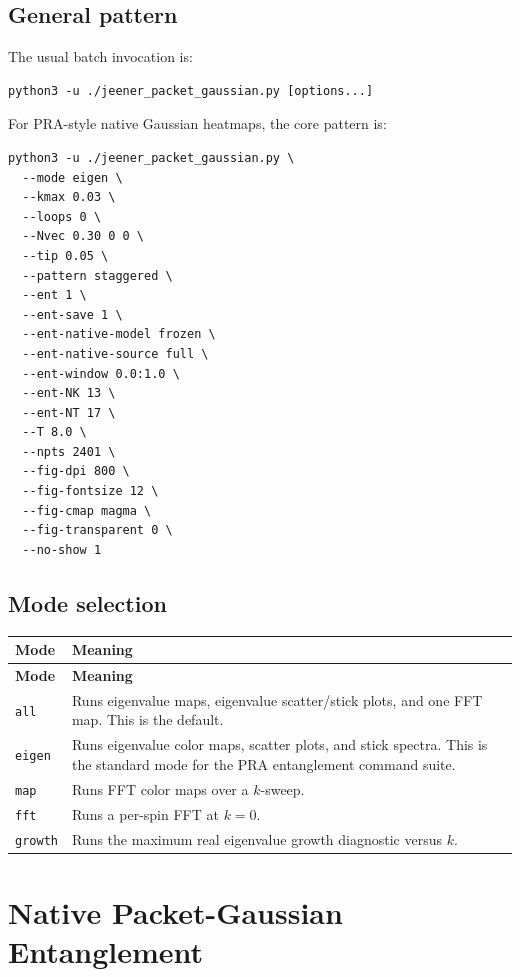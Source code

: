 \documentclass[11pt]{article}
\begin{document}
\subsection{General pattern}
The usual batch invocation is:
\begin{lstlisting}[style=bashstyle]
python3 -u ./jeener_packet_gaussian.py [options...]
\end{lstlisting}

For PRA-style native Gaussian heatmaps, the core pattern is:
\begin{lstlisting}[style=bashstyle]
python3 -u ./jeener_packet_gaussian.py \
  --mode eigen \
  --kmax 0.03 \
  --loops 0 \
  --Nvec 0.30 0 0 \
  --tip 0.05 \
  --pattern staggered \
  --ent 1 \
  --ent-save 1 \
  --ent-native-model frozen \
  --ent-native-source full \
  --ent-window 0.0:1.0 \
  --ent-NK 13 \
  --ent-NT 17 \
  --T 8.0 \
  --npts 2401 \
  --fig-dpi 800 \
  --fig-fontsize 12 \
  --fig-cmap magma \
  --fig-transparent 0 \
  --no-show 1
\end{lstlisting}

\subsection{Mode selection}
\begin{longtable}{L{0.22\textwidth}L{0.70\textwidth}}
\toprule
\textbf{Mode} & \textbf{Meaning} \\
\midrule
\endfirsthead
\toprule
\textbf{Mode} & \textbf{Meaning} \\
\midrule
\endhead
\texttt{all} & Runs eigenvalue maps, eigenvalue scatter/stick plots, and one FFT map. This is the default. \\
\texttt{eigen} & Runs eigenvalue color maps, scatter plots, and stick spectra. This is the standard mode for the PRA entanglement command suite. \\
\texttt{map} & Runs FFT color maps over a \(k\)-sweep. \\
\texttt{fft} & Runs a per-spin FFT at \(k=0\). \\
\texttt{growth} & Runs the maximum real eigenvalue growth diagnostic versus \(k\). \\
\bottomrule
\end{longtable}

\section{Native Packet-Gaussian Entanglement}
\end{document}
